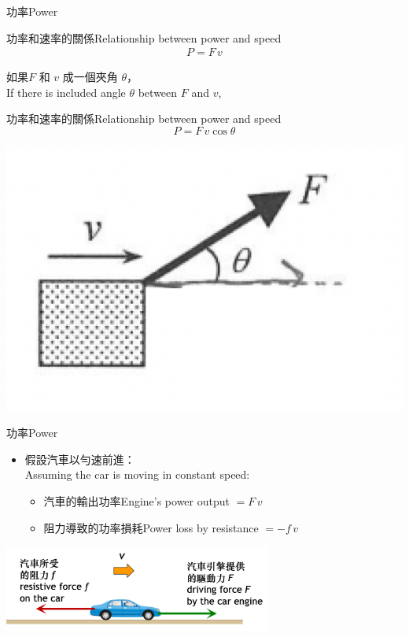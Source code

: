 \documentclass[beamer=true]{standalone}
\begin{document}
\begin{frame}{功率Power}
    \begin{exampleblock}
        {功率和速率的關係Relationship between power and speed}
        \begin{align*}
            P=F\, v
        \end{align*}
    \end{exampleblock}
    如果$F$ 和 $v$ 成一個夾角 $\theta$，\\If there is included angle $\theta$ between $F$ and $v$,
    \begin{alertblock}
        {功率和速率的關係Relationship between power and speed}
        \begin{equation}
            P=F\, v\cos\theta
        \end{equation}
    \end{alertblock}
    {\par\centering
    \includegraphics[width=.3\textwidth]{assets/5b4639e3.png}
    \par}
\end{frame}


\begin{frame}{功率Power}

    \begin{itemize}
        \item 假設汽車以勻速前進：\\Assuming the car is moving in constant speed:
              \begin{itemize}
                  \item 汽車的輸出功率Engine's power output $=F\, v$
                  \item 阻力導致的功率損耗Power loss by resistance  $=-f\, v$
              \end{itemize}
    \end{itemize}\bigskip
    {\par\centering
        \includegraphics[width=0.66\textwidth]{assets/b805447e.png}
        \par}
\end{frame}
\end{document}
